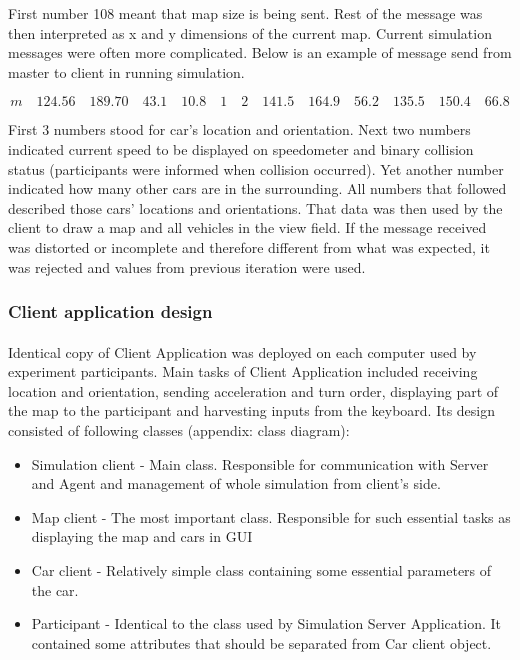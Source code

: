 \documentclass[11pt,english,twoside]{article}
\begin{document}
First number 108 meant that map size is being sent. Rest of the message was then interpreted as x and y dimensions of the current map.
Current simulation messages were often more complicated. Below is an example of message send from master to client in running simulation. 
 
\begin{equation}
m \quad 124.56 \quad 189.70 \quad 43.1 \quad 10.8 \quad 1 \quad 2 \quad 141.5 \quad 164.9  \quad 56.2 \quad 135.5 \quad 150.4  \quad 66.8
\end{equation}

First 3 numbers stood for car's location and orientation. Next two numbers indicated current speed to be displayed on speedometer and binary collision status (participants were informed when collision occurred). Yet another number indicated how many other cars are in the surrounding. All numbers that followed described those cars' locations and orientations. That data was then used by the client to draw a map and all vehicles in the view field. If the message received was distorted or incomplete and therefore different from what was expected, it was rejected and values from previous iteration were used.






\subsubsection{Client application design}
\paragraph{}

Identical copy of Client Application was deployed on  each computer used by experiment participants. Main tasks of Client Application included receiving location and orientation, sending acceleration and turn order, displaying part of the map to the participant and harvesting inputs from the keyboard. Its design consisted of following classes (appendix: class diagram):

\begin{itemize}
\item Simulation client - Main class. Responsible for communication with Server and Agent and management of whole simulation from client's side. 
\item Map client - The most important class. Responsible for such essential tasks as displaying the map and cars in GUI
\item Car client - Relatively simple class containing some essential parameters of the car. 
\item Participant - Identical to the class used by Simulation Server Application. It contained some attributes that should be separated from Car client object.
\end{itemize}
\end{document}
